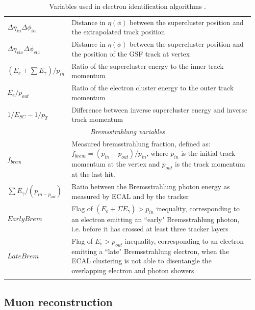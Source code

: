 \begin{center}
\begin{longtable}{|l|p{11cm}|}
\hline	
	$\Delta \eta_{in} \Delta \phi_{in}$ & Distance in $\eta (\phi)$ between the supercluster position and the extrapolated track position \\
	$\Delta \eta_{vtx} \Delta \phi_{vtx}$ & Distance in $\eta (\phi)$ between the supercluster position and the position of the GSF track at vertex \\
	$\left( E_{e} + \sum E_{\gamma} \right)/p_{in}$ & Ratio of the supercluster energy to the inner track momentum \\
	$E_{e}/p_{out}$ & Ratio of the electron cluster energy to the outer track momentum \\
	$1/E_{SC} - 1/p_T$ & Difference between inverse supercluster energy and inverse track momentum \\
\hline	
	\multicolumn{2}{|c|}{\emph{Bremsstrahlung variables}} \\
\hline	
	$f_{brem}$ & Measured bremsstrahlung fraction, defined as: $f_{brem} = (p_{in} - p_{out})/p_{in}$, where $p_{in}$ is the initial track momentum at the vertex and $p_{out}$ is the track momentum at the last hit. \\
	$\sum E_{\gamma}/(p_{in - p_{out}})$ & Ratio between the Bremsstrahlung photon energy as measured by ECAL and by the tracker \\
	$EarlyBrem$ & Flag of $(E_{e} + \Sigma E_{\gamma}) > p_{in}$ inequality, corresponding to an electron emitting an ``early" Bremsstrahlung photon, i.e. before it has crossed at least three tracker layers \\
	$LateBrem$ & Flag of $E_e > p_{out}$ inequality, corresponding to an electron emitting a ``late" Bremsstrahlung electron, when the ECAL clustering is not able to disentangle the overlapping electron and photon showers \\
\hline
\caption{Variables used in electron identification algorithms \cite{SergeyThesis}.}
\label{tab-ElectronMVAID}
\end{longtable} 
\end{center}


\subsection{Muon reconstruction} \label{subsec-MuonReconstruction}

